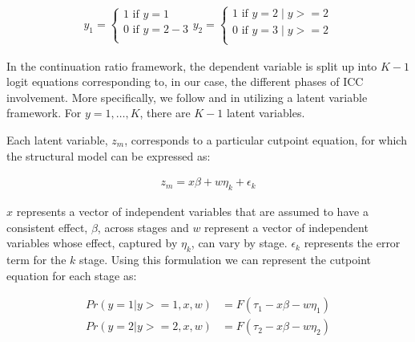 \begin{eqnarray}
	y_{1} =
	\begin{cases}
		1 \text{ if } y = 1 \nonumber \\
		0 \text{ if } y = 2-3 \nonumber \\
	\end{cases}
	y_{2} =
	\begin{cases}
		1 \text{ if } y = 2 \; | \; y >= 2 \nonumber \\
		0 \text{ if } y = 3 \; | \; y >= 2 \nonumber \\
	\end{cases}
\end{eqnarray}

In the continuation ratio framework, the dependent variable is split up into $K-1$ logit equations corresponding to, in our case, the different phases of ICC involvement. More specifically, we follow \citet{tutz1990sequential} and \citet{agresti:2010} in utilizing a latent variable framework. For $y=1,\ldots,K$, there are $K-1$ latent variables.


Each latent variable, $z_{m}$, corresponds to a particular cutpoint equation, for which the structural model can be expressed as:

\begin{align}
	z_{m} = x \beta + w\eta_{k}  + \epsilon_{k}
\end{align}

$x$ represents a vector of independent variables that are assumed to have a consistent effect, $\beta$, across stages and $w$ represent a vector of independent variables whose effect, captured by $\eta_{k}$, can vary by stage. $\epsilon_{k}$ represents the error term for the $k$ stage. Using this formulation we can represent the cutpoint equation for each stage as:

\begin{align}
	Pr(y = 1 | y >= 1, x, w) &= F(\tau_{1} - x\beta - w\eta_{1}) \\
	Pr(y = 2 | y >= 2, x, w) &= F(\tau_{2} - x\beta - w\eta_{2})
\end{align}

